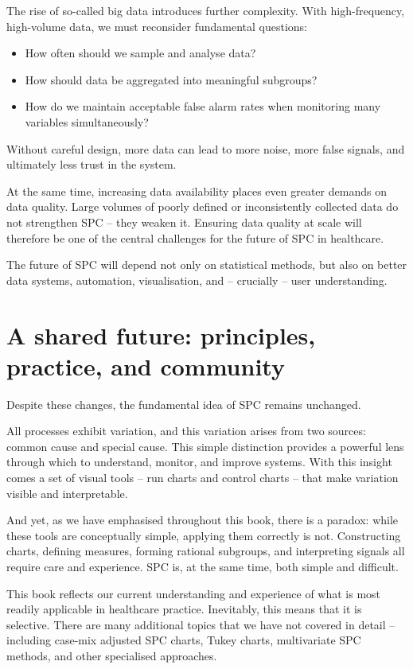 \documentclass[
]{book}
\providecommand{\tightlist}{%
  \setlength{\itemsep}{0pt}\setlength{\parskip}{0pt}}
\begin{document}
The rise of so-called big data introduces further complexity. With high-frequency, high-volume data, we must reconsider fundamental questions:

\begin{itemize}
\tightlist
\item
  How often should we sample and analyse data?
\item
  How should data be aggregated into meaningful subgroups?
\item
  How do we maintain acceptable false alarm rates when monitoring many variables simultaneously?
\end{itemize}

Without careful design, more data can lead to more noise, more false signals, and ultimately less trust in the system.

At the same time, increasing data availability places even greater demands on data quality. Large volumes of poorly defined or inconsistently collected data do not strengthen SPC -- they weaken it. Ensuring data quality at scale will therefore be one of the central challenges for the future of SPC in healthcare.

The future of SPC will depend not only on statistical methods, but also on better data systems, automation, visualisation, and -- crucially -- user understanding.

\section{A shared future: principles, practice, and community}\label{a-shared-future-principles-practice-and-community}

Despite these changes, the fundamental idea of SPC remains unchanged.

All processes exhibit variation, and this variation arises from two sources: common cause and special cause. This simple distinction provides a powerful lens through which to understand, monitor, and improve systems. With this insight comes a set of visual tools -- run charts and control charts -- that make variation visible and interpretable.

And yet, as we have emphasised throughout this book, there is a paradox: while these tools are conceptually simple, applying them correctly is not. Constructing charts, defining measures, forming rational subgroups, and interpreting signals all require care and experience. SPC is, at the same time, both simple and difficult.

This book reflects our current understanding and experience of what is most readily applicable in healthcare practice. Inevitably, this means that it is selective. There are many additional topics that we have not covered in detail -- including case-mix adjusted SPC charts, Tukey charts, multivariate SPC methods, and other specialised approaches.
\end{document}
